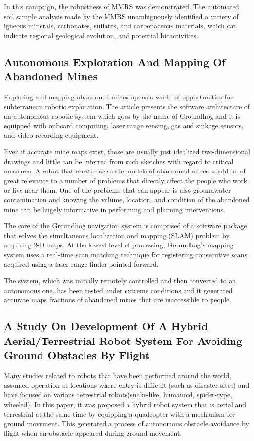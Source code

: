 \documentclass[12pt, twoside]{article}
\begin{document}
In this campaign, the robustness of MMRS was demonstrated. The automated soil sample analysis made by the MMRS unambiguously identified a variety of igneous minerals, carbonates, sulfates, and carbonaceous materials, which can indicate regional geological evolution, and potential bioactivities.


\subsection{Autonomous Exploration And Mapping Of Abandoned Mines\cite{3}}
Exploring and mapping abandoned mines opens a world of opportunities for subterranean robotic exploration. The article presents the software architecture of an autonomous robotic system which goes by the name of Groundhog and it is equipped with onboard computing, laser range sensing, gas and sinkage sensors, and video recording equipment.

Even if accurate mine maps exist, those are usually just idealized two-dimensional drawings and little can be inferred from such sketches with regard to critical measures. A robot that creates accurate models of abandoned mines would be of great relevance to a number of problems that directly affect the people who work or live near them. One of the problems that can appear is also groundwater contamination and knowing the volume, location, and condition of the abandoned mine can be hugely informative in performing and planning interventions.

The core of the Groundhog navigation system is comprised of a software package that solves the simultaneous localization and mapping (SLAM) problem by acquiring 2-D maps. At the lowest level of processing, Groundhog’s mapping system uses a real-time scan matching technique for registering consecutive scans acquired using a laser range finder pointed forward.

The system, which was initially remotely controlled and then converted to an autonomous one, has been tested under extreme conditions and it generated accurate maps fractions of abandoned mines that are inaccessible to people.


\subsection{A Study On Development Of A Hybrid Aerial/Terrestrial Robot System For Avoiding Ground Obstacles By Flight\cite{4}}
Many studies related to robots that have been performed around the world, assumed operation at locations where entry is difficult (such as disaster sites) and have focused on various terrestrial robots(snake-like, humanoid, spider-type, wheeled).  In this paper, it was proposed a hybrid robot system that is aerial and terrestrial at the same time by equipping a quadcopter with a mechanism for ground movement. This generated a process of autonomous obstacle avoidance by flight when an obstacle appeared during ground movement.
\end{document}
